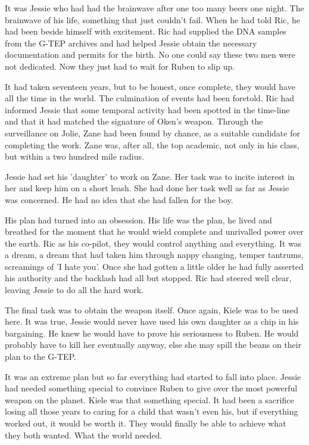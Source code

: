 It was Jessie who had had the brainwave after one too many beers one night.  The brainwave of his life, something that just couldn't fail.  When he had told Ric, he had been beside himself with excitement.  Ric had supplied the DNA samples from the G-TEP archives and had helped Jessie obtain the necessary documentation and permits for the birth.  No one could say these two men were not dedicated.  Now they just had to wait for Ruben to slip up.

It had taken seventeen years, but to be honest, once complete, they would have all the time in the world.  The culmination of events had been foretold.  Ric had informed Jessie that some temporal activity had been spotted in the time-line and that it had matched the signature of Oken's weapon.  Through the surveillance on Jolie, Zane had been found by chance, as a suitable candidate for completing the work.  Zane was, after all, the top academic, not only in his class, but within a two hundred mile radius.  

 Jessie had set his 'daughter' to work on Zane.  Her task was to incite interest in her and keep him on a short leash.  She had done her task well as far as Jessie was concerned.  He had no idea that she had fallen for the boy.

His plan had turned into an obsession.  His life was the plan, he lived and breathed for the moment that he would wield complete and unrivalled power over the earth.  Ric as his co-pilot, they would control anything and everything.  It was a dream, a dream that had taken him through nappy changing, temper tantrums, screamings of 'I hate you'.  Once she had gotten a little older he had fully asserted his authority and the backlash had all but stopped.  Ric had steered well clear, leaving Jessie to do all the hard work.

The final task was to obtain the weapon itself.  Once again, Kiele was to be used here.  It was true, Jessie would never have used his own daughter as a chip in his bargaining.  He knew he would have to prove his seriousness to Ruben.  He would probably have to kill her eventually anyway, else she may spill the beans on their plan to the G-TEP.

It was an extreme plan but so far everything had started to fall into place.  Jessie had needed something special to convince Ruben to give over the most powerful weapon on the planet.  Kiele was that something special.  It had been a sacrifice losing all those years to caring for a child that wasn't even his, but if everything worked out, it would be worth it.  They would finally be able to achieve what they both wanted.  What the world needed.

